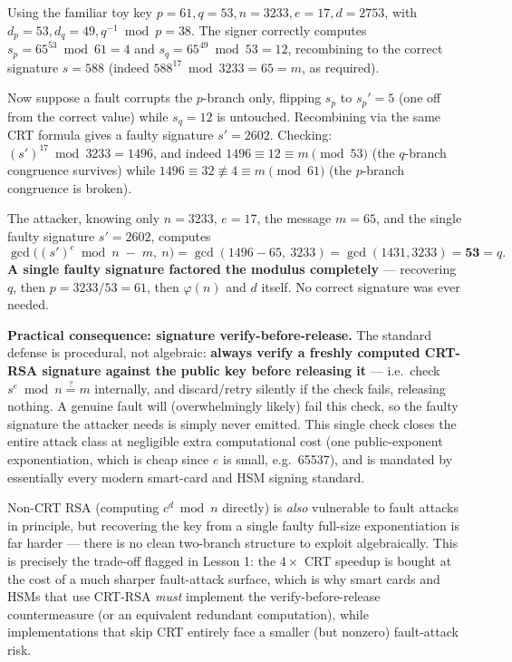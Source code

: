 \begin{example}
Using the familiar toy key $p=61, q=53, n=3233, e=17, d=2753$, with $d_p = 53, d_q = 49, q^{-1} \bmod p = 38$. The signer correctly computes $s_p = 65^{53} \bmod 61 = 4$ and $s_q = 65^{49} \bmod 53 = 12$, recombining to the correct signature $s = 588$ (indeed $588^{17} \bmod 3233 = 65 = m$, as required).

Now suppose a fault corrupts the $p$-branch only, flipping $s_p$ to $s_p' = 5$ (one off from the correct value) while $s_q = 12$ is untouched. Recombining via the same CRT formula gives a faulty signature $s' = 2602$. Checking: $(s')^{17} \bmod 3233 = 1496$, and indeed $1496 \equiv 12 \equiv m \pmod{53}$ (the $q$-branch congruence survives) while $1496 \equiv 32 \not\equiv 4 \equiv m \pmod{61}$ (the $p$-branch congruence is broken).

The attacker, knowing only $n=3233$, $e=17$, the message $m=65$, and the single faulty signature $s'=2602$, computes
\[
\gcd\big((s')^{e} \bmod n \;-\; m,\ n\big) = \gcd(1496 - 65,\ 3233) = \gcd(1431, 3233) = \mathbf{53} = q.
\]
\textbf{A single faulty signature factored the modulus completely} — recovering $q$, then $p = 3233/53 = 61$, then $\varphi(n)$ and $d$ itself. No correct signature was ever needed.
\end{example}

\medskip\noindent\textbf{Practical consequence: signature verify-before-release.} The standard defense is procedural, not algebraic: \textbf{always verify a freshly computed CRT-RSA signature against the public key before releasing it} — i.e.\ check $s^e \bmod n \stackrel{?}{=} m$ internally, and discard/retry silently if the check fails, releasing nothing. A genuine fault will (overwhelmingly likely) fail this check, so the faulty signature the attacker needs is simply never emitted. This single check closes the entire attack class at negligible extra computational cost (one public-exponent exponentiation, which is cheap since $e$ is small, e.g.\ 65537), and is mandated by essentially every modern smart-card and HSM signing standard.

\begin{remark}
Non-CRT RSA (computing $c^d \bmod n$ directly) is \emph{also} vulnerable to fault attacks in principle, but recovering the key from a single faulty full-size exponentiation is far harder — there is no clean two-branch structure to exploit algebraically. This is precisely the trade-off flagged in Lesson 1: the $4\times$ CRT speedup is bought at the cost of a much sharper fault-attack surface, which is why smart cards and HSMs that use CRT-RSA \emph{must} implement the verify-before-release countermeasure (or an equivalent redundant computation), while implementations that skip CRT entirely face a smaller (but nonzero) fault-attack risk.
\end{remark}


